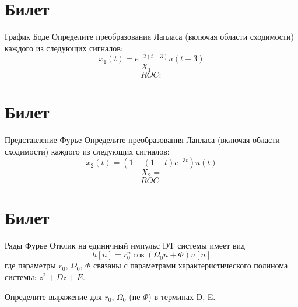 \documentclass{exam}
\begin{document}
\newpage
\section{Билет}
\begin{questions}
	\question 
График Боде 
	\question 
Определите преобразования Лапласа (включая области сходимости) каждого из следующих сигналов:
	\[	
		x_1(t)=e^{-2(t-3)}u(t-3)
		\]
		\[X_1=\]
		\[ROC:\]
\end{questions}

\vspace{15pt}
\newpage
\section{Билет}
\begin{questions}
	\question 
Представление Фурье 
	\question 
Определите преобразования Лапласа (включая области сходимости) каждого из следующих сигналов:
	\[	
		x_2(t)=(1-(1-t)e^{-3t})u(t)
		\]
		\[X_2=\]
		\[ROC:\]

\end{questions}
\vspace{15pt}

\newpage
\section{Билет}
\begin{questions}
	\question 
Ряды Фурье 
	\question 
Отклик на единичный импульс DT системы имеет вид
	\[
h[n]=r_0^n\cos(\Omega_0n+\Phi)u[n]
\]
где параметры \(r_0\), \(\Omega_0\), \(\Phi\) связаны 
с параметрами характеристического полинома системы:
\(z^2+Dz+E\).

	Определите выражение для 
		\(r_0\), \(\Omega_0\) (не \(\Phi\))
		в терминах D, E.


\end{questions}
\vspace{15pt}
\end{document}
